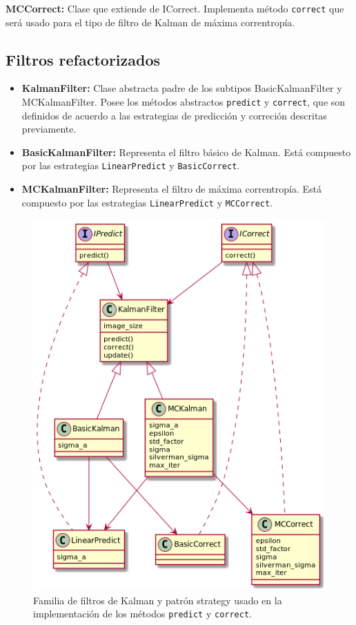 \textbf{MCCorrect:} Clase que extiende de ICorrect. Implementa m\'etodo \texttt{correct} que ser\'a usado para el tipo de filtro de Kalman de m\'axima correntrop\'ia. 

\subsection{Filtros refactorizados}

\begin{itemize}
\item \textbf{KalmanFilter:} Clase abstracta padre de los subtipos BasicKalmanFilter y MCKalmanFilter. Posee los m\'etodos abstractos \texttt{predict} y \texttt{correct}, que son definidos de acuerdo a las estrategias de predicci\'on y correci\'on descritas previamente.
\item \textbf{BasicKalmanFilter:} Representa el filtro b\'asico de Kalman. Est\'a compuesto por las estrategias \texttt{LinearPredict} y \texttt{BasicCorrect}.
\item \textbf{MCKalmanFilter:} Representa el filtro de m\'axima correntrop\'ia. Est\'a compuesto por las estrategias \texttt{LinearPredict} y \texttt{MCCorrect}.
\end{itemize}
\bigskip

\begin{figure}
\centering
\includegraphics[scale=.5]{images/kalmanfilter_class}
\caption{Familia de filtros de Kalman y patr\'on strategy usado en la implementaci\'on de los m\'etodos \texttt{predict} y \texttt{correct}.}
\label{fig:ref1}
\end{figure}

